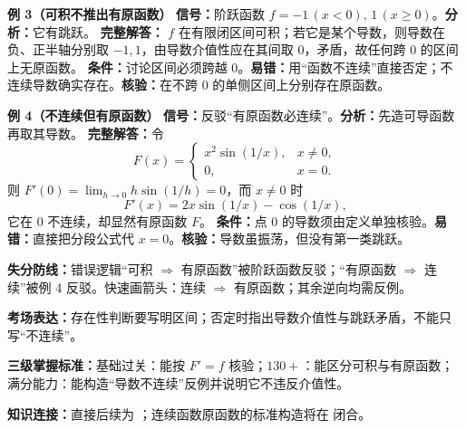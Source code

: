 \begin{knowledgeBox}
\textbf{例 3（可积不推出有原函数）}\quad
\textbf{信号：}阶跃函数 \(f=-1\,(x<0),\,1\,(x\ge0)\)。\textbf{分析：}它有跳跃。
\textbf{完整解答：} \(f\) 在有限闭区间可积；若它是某个导数，则导数在负、正半轴分别取 \(-1,1\)，由导数介值性应在其间取 \(0\)，矛盾，故任何跨 \(0\) 的区间上无原函数。
\textbf{条件：}讨论区间必须跨越 \(0\)。\textbf{易错：}用“函数不连续”直接否定；不连续导数确实存在。\textbf{核验：}在不跨 \(0\) 的单侧区间上分别存在原函数。

\textbf{例 4（不连续但有原函数）}\quad
\textbf{信号：}反驳“有原函数必连续”。\textbf{分析：}先造可导函数再取其导数。
\textbf{完整解答：}令
\[
F(x)=\begin{cases}x^2\sin(1/x),&x\ne0,\\0,&x=0.\end{cases}
\]
则 \(F'(0)=\lim_{h\to0}h\sin(1/h)=0\)，而 \(x\ne0\) 时
\[
F'(x)=2x\sin(1/x)-\cos(1/x),
\]
它在 \(0\) 不连续，却显然有原函数 \(F\)。
\textbf{条件：}点 \(0\) 的导数须由定义单独核验。\textbf{易错：}直接把分段公式代 \(x=0\)。\textbf{核验：}导数虽振荡，但没有第一类跳跃。

\textbf{失分防线：}错误逻辑“可积 \(\Rightarrow\) 有原函数”被阶跃函数反驳；“有原函数 \(\Rightarrow\) 连续”被例 4 反驳。快速画箭头：连续 \(\Rightarrow\) 有原函数；其余逆向均需反例。

\textbf{考场表达：}存在性判断要写明区间；否定时指出导数介值性与跳跃矛盾，不能只写“不连续”。

\textbf{三级掌握标准：}基础过关：能按 \(F'=f\) 核验；\(130+\)：能区分可积与有原函数；满分能力：能构造“导数不连续”反例并说明它不违反介值性。

\textbf{知识连接：}直接后续为 ；连续函数原函数的标准构造将在 闭合。
\end{knowledgeBox}


\par

